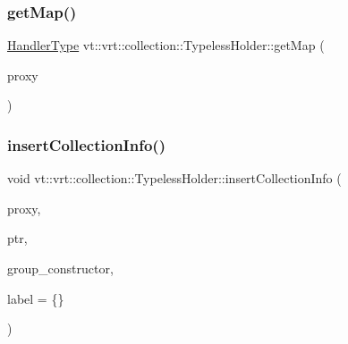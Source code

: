\subsubsection{\texorpdfstring{get\+Map()}{getMap()}}
{\footnotesize\ttfamily \hyperlink{namespacevt_af64846b57dfcaf104da3ef6967917573}{Handler\+Type} vt\+::vrt\+::collection\+::\+Typeless\+Holder\+::get\+Map (\begin{DoxyParamCaption}\item[{\hyperlink{namespacevt_a1b417dd5d684f045bb58a0ede70045ac}{Virtual\+Proxy\+Type} const}]{proxy }\end{DoxyParamCaption})}

\mbox{\label{structvt_1_1vrt_1_1collection_1_1_typeless_holder_aba0109213f140b0d75aea64fb2f1f7a0}} 
\subsubsection{\texorpdfstring{insert\+Collection\+Info()}{insertCollectionInfo()}}
{\footnotesize\ttfamily void vt\+::vrt\+::collection\+::\+Typeless\+Holder\+::insert\+Collection\+Info (\begin{DoxyParamCaption}\item[{\hyperlink{namespacevt_a1b417dd5d684f045bb58a0ede70045ac}{Virtual\+Proxy\+Type} const}]{proxy,  }\item[{std\+::shared\+\_\+ptr$<$ \hyperlink{structvt_1_1vrt_1_1collection_1_1_base_holder}{Base\+Holder} $>$}]{ptr,  }\item[{std\+::function$<$ void()$>$}]{group\+\_\+constructor,  }\item[{std\+::string const \&}]{label = {\ttfamily \{\}} }\end{DoxyParamCaption})}

\mbox{\label{structvt_1_1vrt_1_1collection_1_1_typeless_holder_a10484ae97f0d9cf0011e746806a89481}} 
